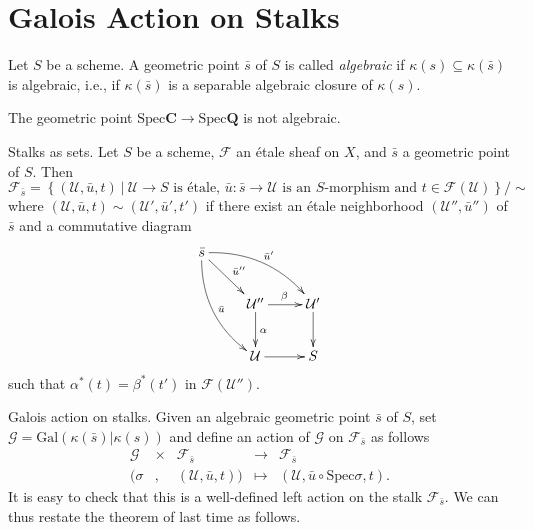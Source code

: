 \section{Galois Action on Stalks}
\label{section-galois-action-stalks}

\begin{definition}
\label{definition-algebraic-geometric-point}
Let $S$ be a scheme. A geometric point $\bar s$ of $S$ is called
{\it algebraic} if $\kappa(s) \subseteq \kappa(\bar s)$ is
algebraic, i.e., if $\kappa(\bar s)$ is a separable algebraic
closure of $\kappa(s)$.
\end{definition}

\begin{example}
\label{example-stupid}
The geometric point $\text{Spec} \mathbf{C} \to \text{Spec} \mathbf{Q}$ is not
algebraic.
\end{example}

\noindent
Stalks as sets. Let $S$ be a scheme, $\mathcal{F}$ an
\'etale sheaf on $X$, and $\bar s$ a geometric point of $S$. Then
$$
\mathcal{F}_{\bar s} = \left\{
(\mathcal{U},\bar u, t) \ \big| \ \mathcal{U} \to S \text{ is \'etale, } \bar u
: \bar s \to \mathcal{U} \text{ is an $S$-morphism and } t \in
\mathcal{F}(\mathcal{U})
\right\}
\big/\sim
$$
where $(\mathcal{U},\bar u, t) \sim (\mathcal{U}',\bar u', t')$ if there exist
an \'etale neighborhood $(\mathcal{U}'',\bar u'')$ of $\bar s$ and a
commutative diagram
$$
\xymatrix{
\bar s \ar^{\bar u''}[rd] \ar^{\bar u'}@/^1pc/[rrd] \ar^{\bar u}@/_1pc/[rdd] \\
& \mathcal{U}'' \ar^{\beta}[r] \ar^{\alpha}[d] & \mathcal{U}' \ar[d] \\
& \mathcal{U} \ar[r] & S
}
$$
such that $\alpha^*(t) = \beta^*(t')$ in $\mathcal{F}(\mathcal{U}'')$.

\medskip\noindent
Galois action on stalks.
Given an algebraic geometric point $\bar s$ of $S$, set $\mathcal{G} =
\text{Gal}(\kappa(\bar s) | \kappa(s))$ and define an action of $\mathcal{G}$
on $\mathcal{F}_{\bar s}$ as follows
$$
\begin{matrix}
\mathcal{G} & \times & \mathcal{F}_{\bar s} & \longrightarrow &
\mathcal{F}_{\bar s} \\
(\sigma & , & (\mathcal{U},\bar u, t)) & \longmapsto & (\mathcal{U},\bar u
\circ \text{Spec} \sigma, t).
\end{matrix}
$$
It is easy to check that this is a well-defined left action on the stalk
$\mathcal{F}_{\bar s}$. We can thus restate the theorem of last time as follows.

